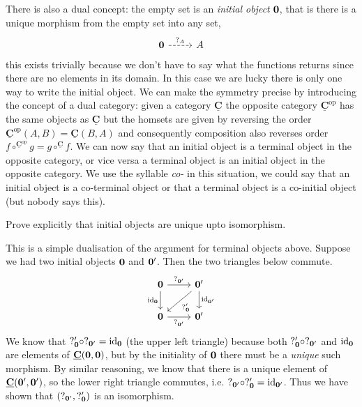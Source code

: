 \documentclass{article}
\newcommand{\cat}[1]{\underline{\mathbf{#1}}}
\newcommand{\id}{\mathrm{id}}
\newcommand{\op}{\mathrm{op}}
\begin{document}
There is also a dual concept: the empty set is an \emph{initial object} $\bf{0}$, that is there is a unique morphism from the empty set into any set, 
\[\begin{tikzcd}
  \bf{0} \arrow[r, dashrightarrow, "?_A"] & A
\end{tikzcd}\]
this exists trivially because we don't have to say what the functions returns since there are no elements in its domain. In this case we are lucky there is only one way to write the initial object. We can make the symmetry precise by introducing the concept of a dual category: given a category $\cat{C}$ the opposite category $\cat{C}^\op$ has the same objects as $\cat{C}$ but the homsets are given by reversing the order $\cat{C}^\op(A,B) = \cat{C}(B,A)$ and consequently composition also reverses order $f \circ^{\cat{C}^\op} g = g \circ^{\cat{C}} f$. We can now say that an initial object is a terminal object in the opposite category, or vice versa a terminal object is an initial object in the opposite 
category. We use the syllable \emph{co-} in this situation, we could say that an initial object is a co-terminal object or that a terminal object is a co-initial object (but nobody says this).

\begin{Exercise}
  Prove explicitly that initial objects are unique upto isomorphism.
\end{Exercise}
\begin{Answer}
  This is a simple dualisation of the argument for terminal objects above. Suppose we had two initial objects $\bf{0}$ and $\bf{0'}$. Then the two triangles below commute.
  \[\begin{tikzcd}
      \bf{0} \arrow{r}{?_{\bf{0'}}} \arrow[swap]{d}{\id_{\bf 0}} & \bf{0'} \arrow{d}{\id_{\bf 0'}} \arrow{dl}{?'_{\bf{0}}} \\
      \bf{0} \arrow[swap]{r}{?_{\bf{0'}}} & \bf{0'}
  \end{tikzcd}\]
  We know that $?'_{\bf 0}\circ ?_{\bf 0'}=\id_{\bf 0}$ (the upper left triangle) because both $?'_{\bf 0}\circ ?_{\bf 0'}$ and $\id_{\bf 0}$ are elements of $\cat{C}({\bf 0}, {\bf 0})$, but by the initiality of $\bf{0}$ there must be a \emph{unique} such morphism. By similar reasoning, we know that there is a unique element of $\cat{C}({\bf 0'}, {\bf 0'})$, so the lower right triangle commutes, i.e. $?_{\bf 0'}\circ ?'_{\bf 0}=\id_{\bf 0'}$. Thus we have shown that $(?_{\bf 0'},?'_{\bf 0})$ is an isomorphism.
\end{Answer}
\end{document}
